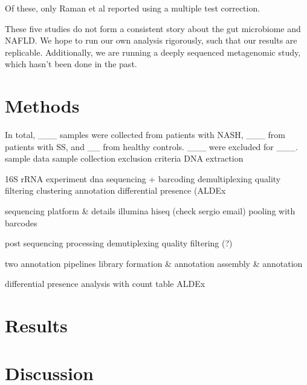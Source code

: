 Of these, only Raman et al \cite{raman2013fecal} reported using a multiple test correction.

These five studies do not form a consistent story about the gut microbiome and NAFLD. We hope to run our own analysis rigorously, such that our results are replicable. Additionally, we are running a deeply sequenced metagenomic study, which hasn’t been done in the past.

\FloatBarrier

\section{Methods}
In total, ___ samples were collected from patients with NASH, ___ from patients with SS, and __ from healthy controls. ___ were excluded for ___.
sample data
sample collection
exclusion criteria
DNA extraction

16S rRNA experiment
dna sequencing + barcoding
demultiplexing
quality filtering
clustering
annotation
differential presence (ALDEx

sequencing platform & details
illumina hiseq (check sergio email)
pooling with barcodes

post sequencing processing
demutiplexing
quality filtering (?)

two annotation pipelines
library formation & annotation
assembly & annotation

differential presence analysis with count table
ALDEx
\section{Results}
\section{Discussion}
